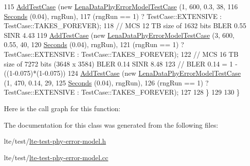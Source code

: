 \begin{DoxyCode}
115       \hyperlink{classns3_1_1TestCase_a3718088e3eefd5d6454569d2e0ddd835}{AddTestCase} (\textcolor{keyword}{new} \hyperlink{classLenaDataPhyErrorModelTestCase}{LenaDataPhyErrorModelTestCase} (1, 600, 0.3, 
      38,
116                                                       \hyperlink{group__timecivil_ga33c34b816f8ff6628e33d5c8e9713b9e}{Seconds} (0.04), rngRun),
117                    (rngRun == 1) ? TestCase::EXTENSIVE : TestCase::TAKES\_FOREVER);
118       \textcolor{comment}{// MCS 12 TB size of 1632 bits  BLER 0.55  SINR 4.43}
119       \hyperlink{classns3_1_1TestCase_a3718088e3eefd5d6454569d2e0ddd835}{AddTestCase} (\textcolor{keyword}{new} \hyperlink{classLenaDataPhyErrorModelTestCase}{LenaDataPhyErrorModelTestCase} (3, 600, 0.55,
       40,
120                                                       \hyperlink{group__timecivil_ga33c34b816f8ff6628e33d5c8e9713b9e}{Seconds} (0.04), rngRun),
121                    (rngRun == 1) ? TestCase::EXTENSIVE : TestCase::TAKES\_FOREVER);
122       \textcolor{comment}{// MCS 16 TB size of 7272 bits (3648 x 3584) BLER 0.14 SINR 8.48}
123       \textcolor{comment}{// BLER 0.14 = 1 - ((1-0.075)*(1-0.075))}
124       \hyperlink{classns3_1_1TestCase_a3718088e3eefd5d6454569d2e0ddd835}{AddTestCase} (\textcolor{keyword}{new} \hyperlink{classLenaDataPhyErrorModelTestCase}{LenaDataPhyErrorModelTestCase} (1, 470, 0.14,
       29,
125                                                       \hyperlink{group__timecivil_ga33c34b816f8ff6628e33d5c8e9713b9e}{Seconds} (0.04), rngRun),
126                    (rngRun == 1) ? TestCase::EXTENSIVE : TestCase::TAKES\_FOREVER);
127 
128     \}
129 
130 \}
\end{DoxyCode}


Here is the call graph for this function\+:




The documentation for this class was generated from the following files\+:\begin{DoxyCompactItemize}
\item 
lte/test/\hyperlink{lte-test-phy-error-model_8h}{lte-\/test-\/phy-\/error-\/model.\+h}\item 
lte/test/\hyperlink{lte-test-phy-error-model_8cc}{lte-\/test-\/phy-\/error-\/model.\+cc}\end{DoxyCompactItemize}
